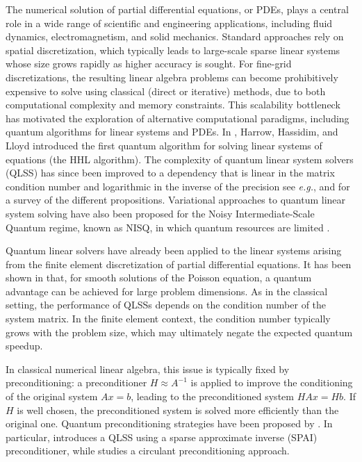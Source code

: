 \documentclass[onefignum,onetabnum]{siamart251216}
\begin{document}
The numerical solution of partial differential equations, or PDEs, plays a central role in a wide range of scientific and engineering applications, including fluid dynamics, electromagnetism, and solid mechanics. Standard approaches rely on spatial discretization, which typically leads to large-scale sparse linear systems whose size grows rapidly as higher accuracy is sought. For fine-grid discretizations, the resulting linear algebra problems can become prohibitively expensive to solve using classical (direct or iterative) methods, due to both computational complexity and memory constraints. This scalability bottleneck has motivated the exploration of alternative computational paradigms, including quantum algorithms for linear systems and PDEs. In \cite{Harrow_2009}, Harrow, Hassidim, and Lloyd introduced the first quantum algorithm for solving linear systems of equations (the HHL algorithm). The complexity of quantum linear system solvers (QLSS) has since been improved to a dependency that is linear in the matrix condition number and logarithmic in the inverse of the precision see \textit{e.g.}, \cite{zbMATH06070940,10.1145/3498331,  zbMATH06823707, PRXQuantum.3.040303, Gily_n_2019, Lin2020optimalpolynomial,PhysRevLett.122.060504} and \cite{morales2025quantumlinearsolverssurvey} for a survey of the different propositions. Variational approaches to quantum linear system solving have also been proposed for the Noisy Intermediate-Scale Quantum regime, known as NISQ, in which quantum resources are limited \cite{BravoPrieto2023variationalquantum}. 

Quantum linear solvers have already been applied to the linear systems arising from the finite element discretization of partial differential equations. It has been shown in \cite{PhysRevA.93.032324} that, for smooth solutions of the Poisson equation, a quantum advantage can be achieved for large problem dimensions. As in the classical setting, the performance of QLSSs depends on the condition number of the system matrix. In the finite element context, the condition number typically grows with the problem size, which may ultimately negate the expected quantum speedup.

In classical numerical linear algebra, this issue is typically fixed by preconditioning: a preconditioner $H \approx A^{-1}$ is applied to improve the conditioning of the original system $Ax = b$, leading to the preconditioned system $HA x = Hb$. If $H$ is well chosen, the preconditioned system is solved more efficiently than the original one. Quantum preconditioning strategies have been proposed by \cite{ bagherimehrab2025fastquantumalgorithmdifferential,PhysRevLett.110.250504, gu2025quantumsimulationhelmholtzequations,Low2026quantumlinearsystem,PhysRevA.98.062321,PhysRevA.104.032422}. In particular, \cite{PhysRevLett.110.250504} introduces a QLSS using a sparse approximate inverse (SPAI) preconditioner, while \cite{PhysRevA.98.062321} studies a circulant preconditioning approach.
\end{document}
